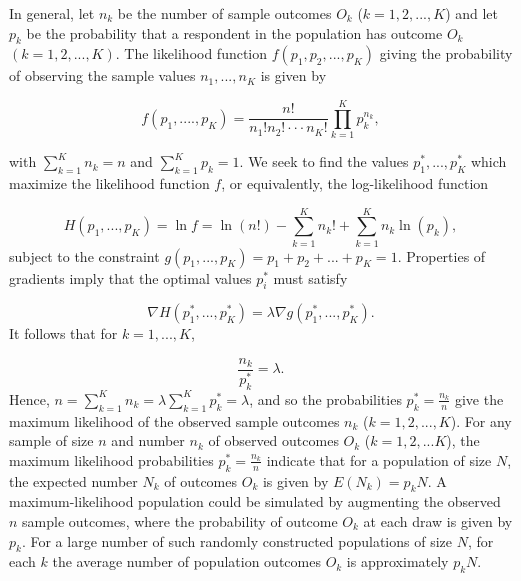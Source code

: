 \documentclass[a4paper, 12pt]{article}
\begin{document}
In general, let $n_k$ be the number of sample outcomes $O_k$ ($k=1,2,...,K$) and let $p_k$ be the probability that a respondent in the population  has outcome $O_k$ $(k= 1, 2, ..., K)$.  The likelihood function $f(p_1, p_2, ..., p_K)$ giving the probability of observing the sample values $n_1, ..., n_{K}$ is given by

\begin{equation}
f(p_1, ...., p_K)= \frac{n!}{n_1!n_2!\cdot\cdot\cdot n_K!} \prod_{k=1}^K p_k^{n_k}, 
\end{equation}
\label{eq:4}

{\flushleft with} $\sum_{k=1}^{K}n_k=n$ and $\sum_{k=1}^{K}p_k=1$.
We seek to find the values $p_1^*, ..., p_{K}^*$ which maximize the likelihood function $f$, or equivalently, the log-likelihood function

\begin{equation}
H(p_1, ..., p_K)=\ln f = \ln(n!) - \sum_{k=1}^{K} n_k! +\sum_{k=1}^{K} n_k\ln(p_k),
\end{equation}
\label{eq:5}
{\flushleft subject} to the constraint $g(p_1, ..., p_{K})=p_1+p_2+...+p_K=1$.  Properties of gradients imply that the optimal values $p_i^*$ must satisfy 

\begin{equation}
\nabla H(p_1^*, ..., p_K^*) = \lambda \nabla g(p_1^*, ..., p_{K}^*).
\end{equation}
\label{eq:6}
{\flushleft It} follows that for $k=1, ..., K$,

\begin{equation}
\frac{n_k}{p_k^*}=\lambda.
\end{equation}
\label{eq:7}
{\flushleft Hence,} $n=\sum_{k=1}^{K} n_k =  \lambda \sum_{k=1}^{K} p_k^* = \lambda$, and so the probabilities $p_k^* = \frac{n_k}{n}$ give the maximum likelihood of the observed sample outcomes $n_k$ ($k=1, 2, ..., K$).  For any sample of size $n$ and number $n_k$ of observed outcomes $O_k$ ($k=1, 2, ...K$), the maximum likelihood probabilities $p_k^*=\frac{n_k}{n}$ 
indicate that for a population of size $N$, the expected number $N_k$ of outcomes $O_k$ is given by $E(N_k)=p_k N.$  A maximum-likelihood population could be simulated by augmenting the observed $n$ sample outcomes, where the probability of outcome $O_k$ at each draw is given by $p_k$.   For a large number of such randomly constructed populations of size $N$, for each $k$ the average number of population outcomes $O_k$ is approximately $p_k N$.  
\end{document}
